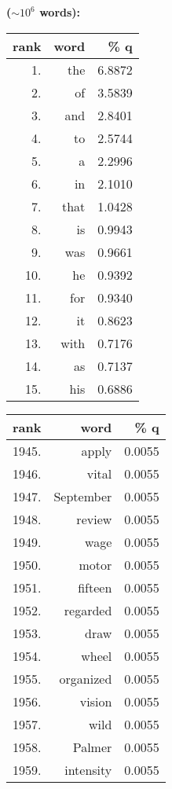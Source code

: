 \textbf{ ($\sim 10^6$ words):}
  \begin{tabular}{|rrr|}
    \hline
    rank & word & \% q \\
    \hline
    1. &     the   &    6.8872 \\
    2. &     of    &    3.5839 \\
    3. &     and   &    2.8401 \\
    4. &     to    &    2.5744 \\
    5. &     a     &    2.2996 \\
    6. &     in    &    2.1010 \\
    7. &     that  &    1.0428 \\
    8. &     is    &    0.9943 \\
    9. &     was   &    0.9661 \\
    10.&     he    &    0.9392 \\
    11.&     for   &    0.9340 \\
    12.&     it    &    0.8623 \\
    13.&     with  &    0.7176 \\
    14.&     as    &    0.7137 \\
    15.&     his   &    0.6886 \\
    \hline
  \end{tabular}\quad\begin{tabular}{|rrr|}
    \hline
    rank & word & \% q \\
    \hline
    1945. &  apply   &      0.0055 \\
    1946. &  vital   &      0.0055 \\
    1947. &  September&      0.0055 \\
    1948. &  review  &      0.0055 \\
    1949. &  wage    &      0.0055 \\
    1950. &  motor   &      0.0055 \\
    1951. &  fifteen &      0.0055 \\
    1952. &  regarded&      0.0055 \\
    1953. &  draw    &      0.0055 \\
    1954. &  wheel   &      0.0055 \\
    1955. &  organized&      0.0055 \\
    1956. &  vision  &      0.0055 \\
    1957. &  wild    &      0.0055 \\
    1958. &  Palmer  &      0.0055 \\
    1959. &  intensity&      0.0055 \\
    \hline
  \end{tabular}



